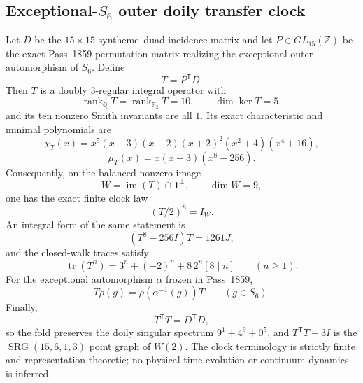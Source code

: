 \subsection{Exceptional-$S_6$ outer doily transfer clock}
Let $D$ be the $15\times15$ syntheme--duad incidence matrix and let
$P\in GL_{15}(\mathbb Z)$ be the exact Pass~1859 permutation matrix realizing
the exceptional outer automorphism of $S_6$. Define
\[
  T=P^{\mathsf T}D.
\]
Then $T$ is a doubly $3$-regular integral operator with
\[
 \operatorname{rank}_{\mathbb Q}T=
 \operatorname{rank}_{\mathbb F_2}T=10,
 \qquad \dim\ker T=5,
\]
and its ten nonzero Smith invariants are all $1$. Its exact characteristic
and minimal polynomials are
\[
 \chi_T(x)=x^5(x-3)(x-2)(x+2)^2(x^2+4)(x^4+16),
\]
\[
 \mu_T(x)=x(x-3)(x^8-256).
\]
Consequently, on the balanced nonzero image
\[
 W=\operatorname{im}(T)\cap\mathbf1^\perp,
 \qquad \dim W=9,
\]
one has the exact finite clock law
\[
 \boxed{(T/2)^8=I_W.}
\]
An integral form of the same statement is
\[
 (T^8-256I)T=1261J,
\]
and the closed-walk traces satisfy
\[
 \operatorname{tr}(T^n)=3^n+(-2)^n+8\,2^n[8\mid n]
 \qquad(n\ge1).
\]
For the exceptional automorphism $\alpha$ frozen in Pass~1859,
\[
 T\rho(g)=\rho(\alpha^{-1}(g))T
 \qquad(g\in S_6).
\]
Finally,
\[
 T^{\mathsf T}T=D^{\mathsf T}D,
\]
so the fold preserves the doily singular spectrum $9^1+4^9+0^5$, and
$T^{\mathsf T}T-3I$ is the $\operatorname{SRG}(15,6,1,3)$ point graph of
$W(2)$. The clock terminology is strictly finite and
representation-theoretic; no physical time evolution or continuum dynamics
is inferred.
